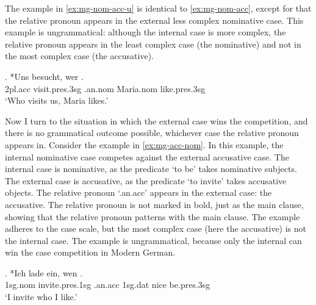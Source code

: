 The example in \ref{ex:mg-nom-acc-u} is identical to \ref{ex:mg-nom-acc}, except for that the relative pronoun appears in the external less complex nominative case. This example is ungrammatical: although the internal case is more complex, the relative pronoun appears in the least complex case (the nominative) and not in the most complex case (the accusative).

\exg. *Uns besucht, wer  .\\
 2\ac{pl}.\ac{acc} visit.\ac{pres}.3\ac{sg}\scsub{[nom]} .\ac{an}.\ac{nom} Maria.\ac{nom} like.\ac{pres}.3\ac{sg}\scsub{[acc]}\\
 `Who visits us, Maria likes.' \label{ex:mg-nom-acc-u}

Now I turn to the situation in which the external case wins the competition, and there is no grammatical outcome possible, whichever case the relative pronoun appears in.
Consider the example in \ref{ex:mg-acc-nom}. In this example, the internal nominative case competes against the external accusative case.
The internal case is nominative, as the predicate  `to be' takes nominative subjects.
The external case is accusative, as the predicate  `to invite' takes accusative objects.
The relative pronoun  `.\ac{an}.\ac{acc}' appears in the external case: the accusative. The relative pronoun is not marked in bold, just as the main clause, showing that the relative pronoun patterns with the main clause.
The example adheres to the case scale, but the most complex case (here the accusative) is not the internal case. The example is ungrammatical, because only the internal can win the case competition in Modern German.

\exg. *Ich {lade ein}, wen   .\\
1\ac{sg}.\ac{nom} invite.\ac{pres}.1\ac{sg}\scsub{[acc]} .\ac{an}.\ac{acc} 1\ac{sg}.\ac{dat} nice be.\ac{pres}.3\ac{sg}\scsub{[nom]}\\
`I invite who I like.' \label{ex:mg-acc-nom}

